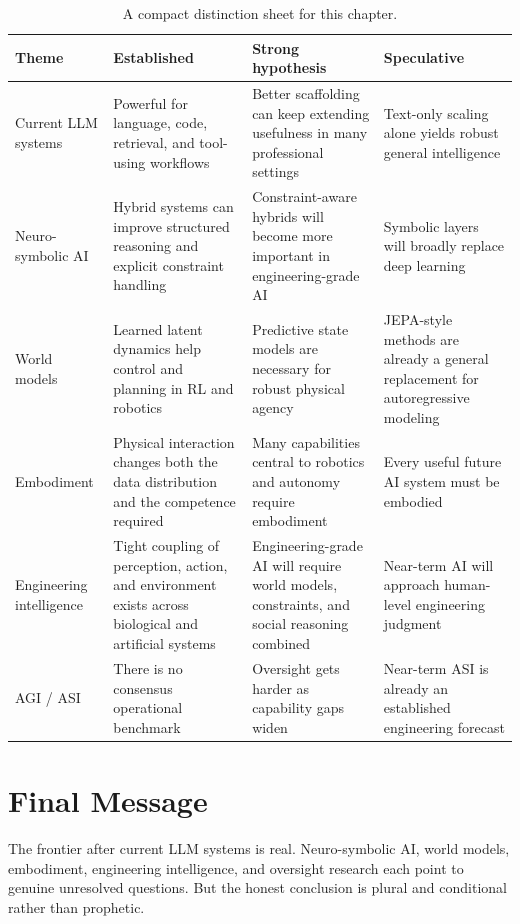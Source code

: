 \documentclass[12pt]{article}
\begin{document}
\begin{table}[ht]
    \centering
    \caption{A compact distinction sheet for this chapter.}
    \label{t18tab:distinctions}
    \renewcommand{\arraystretch}{1.2}
    \small
    \begin{tabulary}{\textwidth}{LLLL}
        \toprule
        \textbf{Theme} & \textbf{Established} & \textbf{Strong hypothesis} & \textbf{Speculative} \\
        \midrule
        Current LLM systems & Powerful for language, code, retrieval, and tool-using workflows & Better scaffolding can keep extending usefulness in many professional settings & Text-only scaling alone yields robust general intelligence \\
        Neuro-symbolic AI & Hybrid systems can improve structured reasoning and explicit constraint handling & Constraint-aware hybrids will become more important in engineering-grade AI & Symbolic layers will broadly replace deep learning \\
        World models & Learned latent dynamics help control and planning in RL and robotics & Predictive state models are necessary for robust physical agency & JEPA-style methods are already a general replacement for autoregressive modeling \\
        Embodiment & Physical interaction changes both the data distribution and the competence required & Many capabilities central to robotics and autonomy require embodiment & Every useful future AI system must be embodied \\
        Engineering intelligence & Tight coupling of perception, action, and environment exists across biological and artificial systems & Engineering-grade AI will require world models, constraints, and social reasoning combined & Near-term AI will approach human-level engineering judgment \\
        AGI / ASI & There is no consensus operational benchmark & Oversight gets harder as capability gaps widen & Near-term ASI is already an established engineering forecast \\
        \bottomrule
    \end{tabulary}
\end{table}

\section{Final Message}

The frontier after current LLM systems is real. Neuro-symbolic AI, world models, embodiment, engineering intelligence, and oversight research each point to genuine unresolved questions. But the honest conclusion is plural and conditional rather than prophetic.
\end{document}
